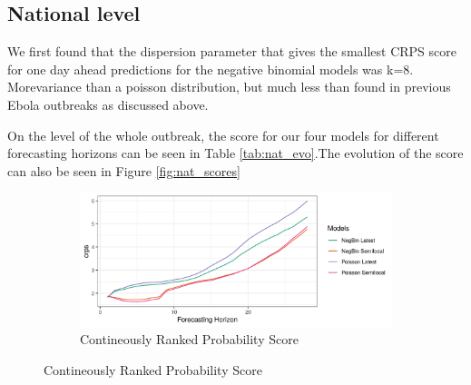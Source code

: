\documentclass[12pt]{article}
\begin{document}
\subsection{National level}
We first found that the dispersion parameter that gives the smallest CRPS score for one day ahead predictions for the negative binomial models was k=8. Morevariance than a poisson distribution, but much less than found in previous Ebola outbreaks as discussed above. 

On the level of the whole outbreak, the score for our four models for different forecasting horizons can be seen in Table \ref{tab:nat_evo}.The evolution of the score can also be seen in Figure \ref{fig:nat_scores}



\begin{figure}[h]
\begin{subfigure}{\textwidth}
  \centering
  \includegraphics[width=0.9\linewidth]{../output/national_crps.png}  
  \caption{Contineously Ranked Probability Score}
  \label{fig:sub-first}
\end{subfigure}


\end{figure}
\end{document}
